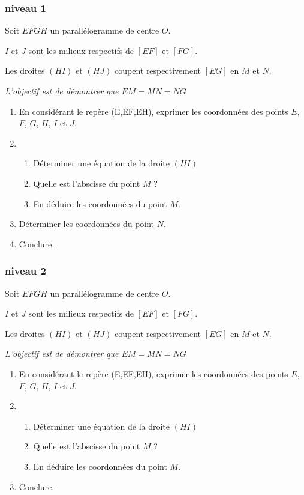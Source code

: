 
\subsubsection{niveau 1}

Soit $EFGH$ un parallélogramme de centre $O$.

$I$ et $J$ sont les milieux respectifs de $[EF]$ et $[FG]$.

Les droites $(HI)$ et $(HJ)$ coupent respectivement $[EG]$ en $M$ et $N$.

\textit{L'objectif est de démontrer que $EM=MN=NG$}

\begin{enumerate}
\item En considérant le repère (E,EF,EH), exprimer les coordonnées des points $E$, $F$, $G$, $H$, $I$ et $J$.
\item 
\begin{enumerate}
\item Déterminer une équation de la droite $(HI)$
\item Quelle est l'abscisse du point $M$ ?
\item En déduire les coordonnées du point $M$.
\end{enumerate}
\item Déterminer les coordonnées du point $N$.
\item Conclure.
\end{enumerate}

\subsubsection{niveau 2}

Soit $EFGH$ un parallélogramme de centre $O$.

$I$ et $J$ sont les milieux respectifs de $[EF]$ et $[FG]$.

Les droites $(HI)$ et $(HJ)$ coupent respectivement $[EG]$ en $M$ et $N$.

\textit{L'objectif est de démontrer que $EM=MN=NG$}

\begin{enumerate}
\item En considérant le repère (E,EF,EH), exprimer les coordonnées des points $E$, $F$, $G$, $H$, $I$ et $J$.
\item 
\begin{enumerate}
\item Déterminer une équation de la droite $(HI)$
\item Quelle est l'abscisse du point $M$ ?
\item En déduire les coordonnées du point $M$.
\end{enumerate}
\item Conclure.
\end{enumerate}


